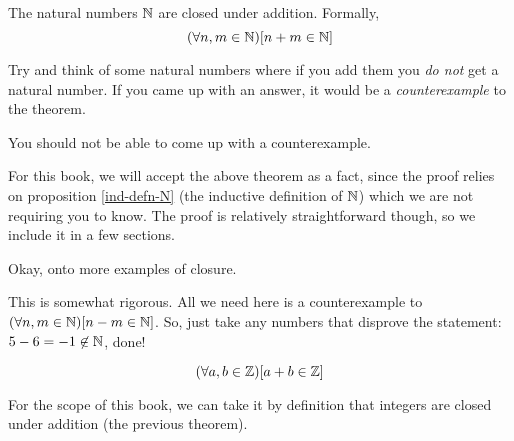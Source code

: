 \documentclass[main.tex]{subfiles}
\begin{document}
\begin{thm}
	The natural numbers \(\mathbb{N}\) are closed under addition. Formally, \[(\forall n,m \in \mathbb{N})[n+m \in \mathbb{N}]\]
\end{thm}

\begin{example}
	Try and think of some natural numbers where if you add them you \textit{do not} get a natural number. If you came up with an answer, it would be a \textit{counterexample} to the theorem.
	
	You should not be able to come up with a counterexample.
\end{example}

\begin{rem}
	For this book, we will accept the above theorem as a fact, since the proof relies on proposition \ref{ind-defn-N} (the inductive definition of \(\mathbb{N}\)) which we are not requiring you to know. The proof is relatively straightforward though, so we include it in a few sections.
\end{rem}

Okay, onto more examples of closure.



\begin{rem}
	This is somewhat rigorous. All we need here is a counterexample to \((\forall n,m \in \mathbb{N})[n - m \in \mathbb{N}]\). So, just take any numbers that disprove the statement: \(5 - 6 = -1 \not\in \mathbb{N}\), done!
\end{rem}

\begin{thm}
	\[(\forall a,b \in \mathbb{Z})[a + b \in \mathbb{Z}]\]
\end{thm}

\begin{rem}
	For the scope of this book, we can take it by definition that integers are closed under addition (the previous theorem).
\end{rem}
\end{document}
